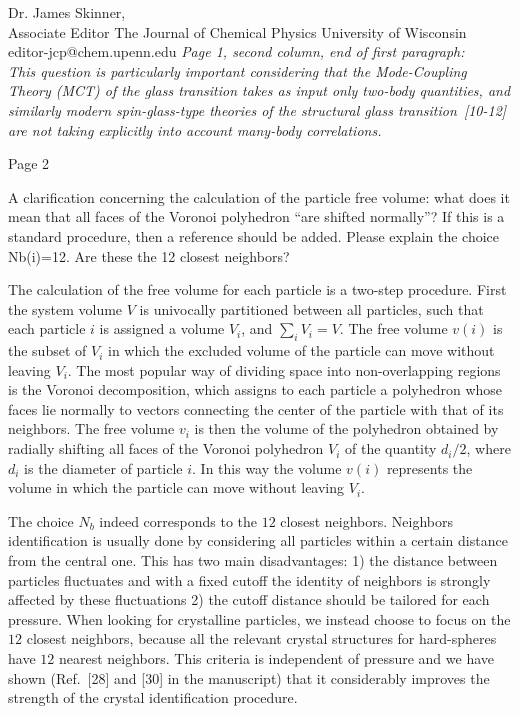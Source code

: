 \documentclass[a4paper, rebuttal, parskip=true, firsthead=false, fromemail=false, foldmarks=false]{scrlttr2}
\begin{document}
\begin{letter}{Dr. James Skinner,\\Associate Editor
The Journal of Chemical Physics
University of Wisconsin\\
editor-jcp@chem.upenn.edu }
{\it Page 1, second column, end of first paragraph:\\
This question is particularly important considering that the Mode-Coupling Theory (MCT) of the glass transition takes as input only two-body quantities, and
similarly modern spin-glass-type theories of the structural glass transition~[10-12] are not taking explicitly into account many-body correlations.
}


\begin{quotationi}
Page 2

A clarification concerning the calculation of the particle free volume: what does it mean that all faces of the Voronoi polyhedron ``are shifted normally''? If this is a standard procedure, then a reference should be added.
Please explain the choice Nb(i)=12. Are these the 12 closest neighbors?
\end{quotationi}

The calculation of the free volume for each particle is a two-step procedure. First the system volume $V$ is univocally partitioned between all particles,
such that each particle $i$ is assigned a volume $V_i$, and $\sum_i V_i=V$. The free volume $v(i)$ is the subset of $V_i$ in which the excluded volume of
the particle can move without leaving $V_i$. The most popular way of dividing space into non-overlapping regions is the Voronoi decomposition, which assigns to each
particle a polyhedron whose faces lie normally to vectors connecting the center of the particle with that of its neighbors. The free volume $v_i$ is
then the volume of the polyhedron obtained by radially shifting all faces of the Voronoi polyhedron $V_i$ of the quantity $d_i/2$, where $d_i$ is the diameter of particle $i$. In this way the volume $v(i)$ represents the volume in which the particle can move without leaving $V_i$.

The choice $N_b$ indeed corresponds to the $12$ closest neighbors. Neighbors identification is usually done by considering all particles within
a certain distance from the central one. This has two main disadvantages: 1) the distance between particles fluctuates and with a fixed cutoff the
identity of neighbors is strongly affected by these fluctuations 2) the cutoff distance should be tailored for each pressure.
When looking for crystalline particles, we instead choose to focus on the $12$ closest neighbors, because all the relevant crystal structures for
hard-spheres have $12$ nearest neighbors. This criteria is independent of pressure and we have shown (Ref.~[28] and [30] in the manuscript) that it considerably
improves the strength of the crystal identification procedure.


\end{letter}
\end{document}
